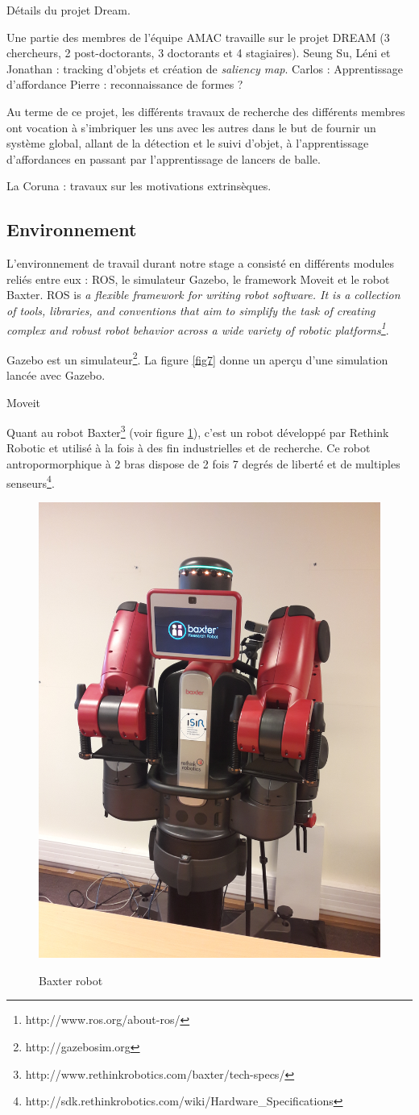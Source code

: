 \documentclass{llncs}
\begin{document}
Détails du projet Dream.

Une partie des membres de l'équipe AMAC travaille sur le projet DREAM (3 chercheurs, 2 post-doctorants, 3 doctorants et 4 stagiaires).
Seung Su, Léni et Jonathan : tracking d'objets et création de \textit{saliency map}.
Carlos : Apprentissage d'affordance
Pierre : reconnaissance de formes ?

Au terme de ce projet, les différents travaux de recherche des différents membres ont vocation à s'imbriquer les uns avec les autres dans le but de fournir un système global, allant de la détection et le suivi d'objet, à l'apprentissage d'affordances en passant par l'apprentissage de lancers de balle.

La Coruna : travaux sur les motivations extrinsèques.

\subsection{Environnement}

L'environnement de travail durant notre stage a consisté en différents modules reliés entre eux : ROS,  le simulateur  Gazebo, le framework Moveit et le robot Baxter. ROS is \textit{a flexible framework for writing robot software. It is a collection of tools, libraries, and conventions that aim to simplify the task of creating complex and robust robot behavior across a wide variety of robotic platforms\footnote{http://www.ros.org/about-ros/}}.

Gazebo est un simulateur\footnote{http://gazebosim.org}. La figure \ref{fig7} donne un aperçu d'une simulation lancée avec Gazebo.

Moveit

Quant au robot Baxter\footnote{http://www.rethinkrobotics.com/baxter/tech-specs/} (voir figure \ref{fig:baxter}), c'est un robot développé par Rethink Robotic et utilisé à la fois à des fin industrielles et de recherche. Ce robot antropormorphique à 2 bras dispose de 2 fois 7 degrés de liberté et de multiples  senseurs\footnote{http://sdk.rethinkrobotics.com/wiki/Hardware\_Specifications}.

\begin{figure}
	\centering
	\includegraphics[angle=-90,width=.5\textwidth]{figures/baxter}
	\label{fig:baxter}
	\caption{Baxter robot}
\end{figure}
\end{document}
